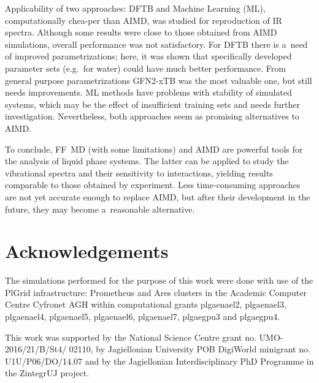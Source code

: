 Applicability of two approaches: DFTB and Machine Learning (ML), computationally chea-per than AIMD, was studied for reproduction of IR spectra. Although some results were close to those obtained from AIMD simulations, overall performance was not satisfactory. For DFTB there is a~need of improved parametrizations; here, it was shown that specifically developed parameter sets (e.g.~for water) could have much better performance. From general purpose parametrizations GFN2-xTB was the most valuable one, but still needs improvements. ML methods have problems with stability of simulated systems, which may be the effect of insufficient training sets and needs further investigation. Nevertheless, both approaches seem as promising alternatives to AIMD.

To conclude, FF~MD (with some limitations) and AIMD are powerful tools for the analysis of liquid phase systems. The latter can be applied to study the vibrational spectra and their sensitivity to interactions, yielding results comparable to those obtained by experiment. Less time-consuming approaches are not yet accurate enough to replace AIMD, but after their development in the future, they may become a~reasonable alternative.

\section{Acknowledgements}

The simulations performed for the purpose of this work were done with use of the PlGrid infrastructure: Prometheus and Ares clusters in the Academic Computer Centre Cyfronet AGH within computational grants plgaenael2, plgaenael3, plgaenael4, plgaenael5, plgaenael6, plgaenael7, plgaegpu3 and plgaegpu4.

This work was supported by the National Science Centre grant no. UMO-2016/21/B/St4/ 02110, by Jagiellonian University POB DigiWorld minigrant no. U1U/P06/DO/14.07 and by the Jagiellonian Interdisciplinary PhD Programme in the ZintegrUJ project.